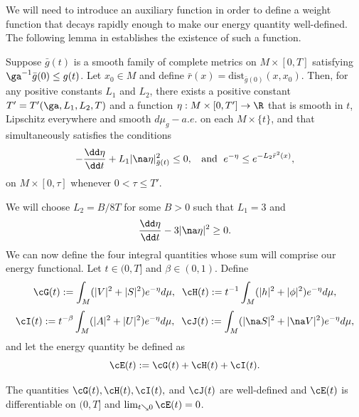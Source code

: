 \documentclass[hidelinks, 12pt, oneside, reqno]{amsart}
\begin{document}
We will need to introduce an auxiliary function in order to define a weight function that decays rapidly enough to make our energy quantity well-defined. The following lemma in \cite{kotschwarEnergy} establishes the existence of such a function. 

\begin{lem}\label{lemma decay function}\cite[Lemma 5]{kotschwarEnergy}
    Suppose $\bar g(t)$ is a smooth family of complete metrics on $M \times [0,T]$ satisfying $\ga^{-1}\bar g(0) \le g(t)$. Let $x_0 \in M$ and define $\bar r(x) = \mathrm{dist}_{\bar g(0)}(x,x_0)$. Then, for any positive constants $L_1$ and $L_2$, there exists a positive constant $T' = T'(\ga, L_1,L_2,T)$ and a function $\eta: M \times [0,T'] \rightarrow \R$ that is smooth in $t$, Lipschitz everywhere and smooth $d\mu_g-a.e.$ on each $M \times \{t\}$, and that simultaneously satisfies the conditions
    \[
    -\frac{\dd \eta}{\dd t} + L_1 |\na \eta|^2_{\bar g(t)} \le 0,  \;\; \text{ and } \; e^{-\eta} \le e^{-L_2\bar r^2(x)},
    \]
    on $M \times [0,\tau]$ whenever $0 < \tau  \le T'$.
\end{lem}
We will choose $L_2 = B/8T$ for some $B>0$ such that $L_1 = 3$ and 
\[
\frac{\dd \eta}{\dd t} - 3|\na \eta|^2 \ge 0. 
\]
We can now define the four integral quantities whose sum will comprise our energy functional. Let $t \in (0,T]$ and $\beta \in  (0,1)$. Define 
\[
\cG (t) := \int_M (|V|^2 + |S|^2)e^{-\eta} d\mu, \;\; \cH(t) := t^{-1}\int_M (|h|^2 + |\phi|^2)e^{-\eta}d\mu,
\]
\[
\cI (t) := t^{-\beta}\int_M (|A|^2 + |U|^2)e^{-\eta} d\mu, \;\; \cJ(t) := \int_M (|\na S|^2 + |\na V|^2)e^{-\eta}d\mu,
\]
and let the energy quantity be defined as
\[
\cE(t) := \cG(t) + \cH(t) + \cI(t). 
\]

\begin{lem}\label{lemma well defined integral quantities}
The quantities $\cG(t), \cH(t), \cI(t),$ and $\cJ(t)$ are well-defined and $\cE(t)$ is differentiable on $(0, T]$ and $\lim_{t\searrow 0} \cE(t) = 0$.
\end{lem}
\end{document}
